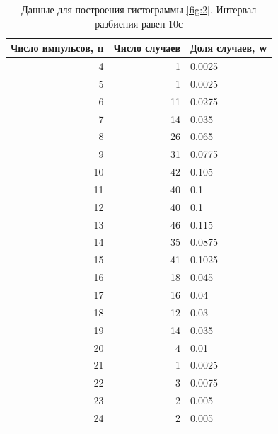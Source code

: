 \documentclass[12pt]{article}
\begin{document}
\begin{table}[H]
    \begin{center}
        \begin{tabular}{|r|r|l|}
            \hline
            Число импульсов, n & Число случаев & Доля случаев, w \\
            \hline
            4                  & 1             & 0.0025          \\
            5                  & 1             & 0.0025          \\
            6                  & 11            & 0.0275          \\
            7                  & 14            & 0.035           \\
            8                  & 26            & 0.065           \\
            9                  & 31            & 0.0775          \\
            10                 & 42            & 0.105           \\
            11                 & 40            & 0.1             \\
            12                 & 40            & 0.1             \\
            13                 & 46            & 0.115           \\
            14                 & 35            & 0.0875          \\
            15                 & 41            & 0.1025          \\
            16                 & 18            & 0.045           \\
            17                 & 16            & 0.04            \\
            18                 & 12            & 0.03            \\
            19                 & 14            & 0.035           \\
            20                 & 4             & 0.01            \\
            21                 & 1             & 0.0025          \\
            22                 & 3             & 0.0075          \\
            23                 & 2             & 0.005           \\
            24                 & 2             & 0.005           \\
            \hline
        \end{tabular}
    \end{center}
    \caption{Данные для построения гистограммы \ref{fig:2}. Интервал разбиения равен 10с}
    \label{tab:7}
\end{table}
\end{document}
